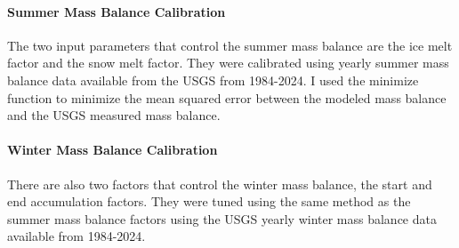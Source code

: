 \documentclass{article}
\begin{document}
\FloatBarrier

\paragraph{Summer Mass Balance Calibration}
The two input parameters that control the summer mass balance are the ice melt factor and the snow melt factor. They were calibrated using yearly summer 
mass balance data available from the USGS from 1984-2024. I used the minimize function 
to minimize the mean squared error between the modeled mass balance and the USGS measured mass balance. 
\paragraph{Winter Mass Balance Calibration}
There are also two factors that control the winter mass balance, the start and end accumulation factors. They were tuned using the same 
method as the summer mass balance factors using the USGS yearly winter mass balance data available from 1984-2024.
\end{document}

